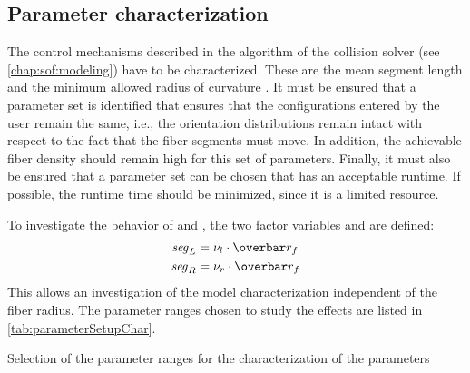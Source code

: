\subsection{Parameter characterization}\label{sec:modelSetup}
%
The control mechanisms described in the algorithm of the collision solver  (see \cref{chap:sof:modeling}) have to be characterized.
These are the mean segment length \segLength{} and the minimum allowed radius of curvature \segRadius{}.
It must be ensured that a parameter set is identified that ensures that the configurations entered by the user remain the same, i.e., the orientation distributions remain intact with respect to the fact that the fiber segments must move.
In addition, the achievable fiber density should remain high for this set of parameters.
Finally, it must also be ensured that a parameter set can be chosen that has an acceptable runtime.
If possible, the runtime time should be minimized, since it is a limited resource.
\par
%
To investigate the behavior of \segLength{} and \segRadius{}, the two factor variables \segLengthFactor{} and \segRadiusFactor{} are defined:
\begin{align}
    \begin{split}
        \segLength &= \segLengthFactor \cdot \fiberRadiusMean\\
        \segRadius &= \segRadiusFactor \cdot \fiberRadiusMean
    \end{split}
\end{align}
This allows an investigation of the model characterization independent of the fiber radius.
The parameter ranges chosen to study the effects are listed in \cref{tab:parameterSetupChar}.
%
\begin{table}[!b]
%
\centering
{}
\caption{Selection of the parameter ranges for the characterization of the parameters}
\label{tab:parameterSetupChar}
\end{table}
